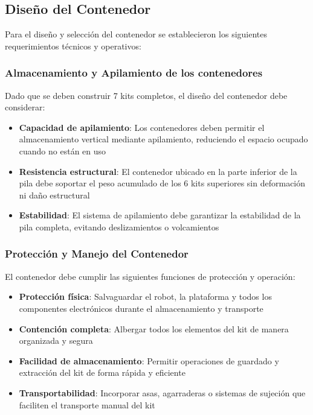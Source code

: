 \subsection{Diseño del Contenedor}

Para el diseño y selección del contenedor se establecieron los siguientes requerimientos técnicos y operativos:

\subsubsection{Almacenamiento y Apilamiento de los contenedores}

Dado que se deben construir 7 kits completos, el diseño del contenedor debe considerar:

\begin{itemize}
    \item \textbf{Capacidad de apilamiento}: Los contenedores deben permitir el almacenamiento vertical mediante apilamiento, reduciendo el espacio ocupado cuando no están en uso
    \item \textbf{Resistencia estructural}: El contenedor ubicado en la parte inferior de la pila debe soportar el peso acumulado de los 6 kits superiores sin deformación ni daño estructural
    \item \textbf{Estabilidad}: El sistema de apilamiento debe garantizar la estabilidad de la pila completa, evitando deslizamientos o volcamientos
\end{itemize}

\subsubsection{ Protección y Manejo del Contenedor}

El contenedor debe cumplir las siguientes funciones de protección y operación:

\begin{itemize}
    \item \textbf{Protección física}: Salvaguardar el robot, la plataforma y todos los componentes electrónicos durante el almacenamiento y transporte
    \item \textbf{Contención completa}: Albergar todos los elementos del kit de manera organizada y segura
    \item \textbf{Facilidad de almacenamiento}: Permitir operaciones de guardado y extracción del kit de forma rápida y eficiente
    \item \textbf{Transportabilidad}: Incorporar asas, agarraderas o sistemas de sujeción que faciliten el transporte manual del kit
\end{itemize}

